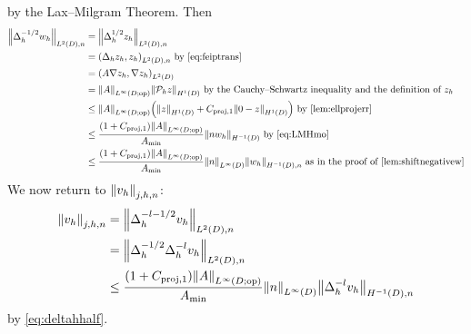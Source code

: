 \beq\label{eq:LMHmo}
 \leq {} 
\eeq
by the Lax--Milgram Theorem. Then
\begin{align}
\NLtDn{\Deltah^{-1/2}\wh} &= \NLtDn{\Deltah^{1/2} \zh}\nonumber\\
&= \IPLtDn{\Deltah \zh}{\zh} \text{ by \cref{eq:feiptrans}}\\
&= \IPLtD{A \grad \zh}{\grad \zh}\nonumber\\
&= \NLiDop{A} \NHoD{\Ph z}\nonumber\text{ by the Cauchy--Schwartz inequality and the definition of } \zh\\
&\leq \NLiDop{A}\mleft(\NHoD{z} + \Cprojfn{1}\NHoD{0 - z}\mright) \text{ by \cref{lem:ellprojerr}}\nonumber\\
&\leq \frac{\mleft(1+\Cprojfn{1}\mright)\NLiDop{A}}{\Amin}  \NHmoD{n\wh}\text{ by \cref{eq:LMHmo}}\label{eq:deltahhalf}\\
&\leq \frac{\mleft(1+\Cprojfn{1}\mright)\NLiDop{A}}{\Amin}\NLiD{n}  \NHnfn{-1}{D}{\wh}\text{ as in the proof of \cref{lem:shiftnegativew}}\nonumber
\end{align}
We now return to $\Njhn{\vh}$:
\begin{align*}
  \Nfn{j,h,n}{\vh} &= \NLtDn{\Deltah^{-l-1/2} \vh}\\
  &= \NLtDn{\Deltah^{-1/2} \Deltah^{-l} \vh}\\
&\leq \frac{\mleft(1+\Cprojfn{1}\mright)\NLiDop{A}}{\Amin}\NLiD{n}\NHnfn{-1}{D}{\Deltah^{-l}\vh}
\end{align*}
by \cref{eq:deltahhalf}.


